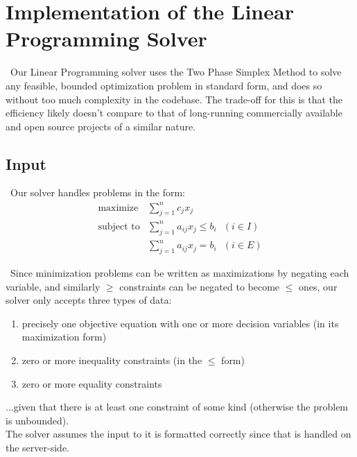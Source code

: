 \documentclass[11pt]{article}
\begin{document}
\section{Implementation of the Linear Programming Solver}

~\indent Our Linear Programming solver uses the Two Phase 
Simplex Method \cite{chvatal83} to solve any feasible, bounded optimization problem in standard form, and does so without too much complexity in the codebase. The trade-off for this is that the efficiency likely doesn't compare to that of long-running commercially available and open source projects of a similar nature.
    \subsection{Input}
~\indent Our solver handles problems in the form:
\begin{eqnarray*}
\mbox{maximize}& \sum\limits_{j=1}^n c_jx_j\\
\mbox{subject to}& \sum\limits_{j=1}^n a_{ij}x_j \leq b_i\mbox{\ \ }(i \in I)\\
& \sum\limits_{j=1}^n a_{ij}x_j = b_i\mbox{\ \ }(i \in E)
\end{eqnarray*}

~\indent Since minimization problems can be written as maximizations by negating each variable, and similarly $\geq$ constraints can be negated to become $\leq$ ones, our solver only accepts three types of data:
\begin{enumerate}
\item precisely one objective equation with one or more decision variables (in its maximization form)
\item zero or more inequality constraints (in the $\leq$ form)
\item zero or more equality constraints
\end{enumerate}
...given that there is at least one constraint of some kind (otherwise the problem is unbounded).\\
The solver assumes the input to it is formatted correctly since that is handled on the server-side.
\end{document}
